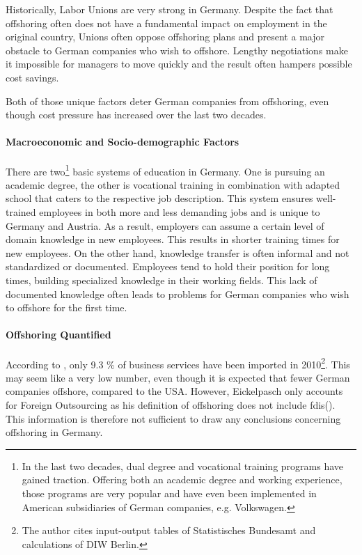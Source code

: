 Historically, Labor Unions are very strong in Germany. Despite the fact that offshoring often does not have a fundamental impact on employment in the original country, Unions often oppose offshoring plans and present a major obstacle to German companies who wish to offshore. Lengthy negotiations make it impossible for managers to move quickly and the result often hampers possible cost savings.

Both of those unique factors deter German companies from offshoring, even though cost pressure has increased over the last two decades.

\paragraph{Macroeconomic and Socio-demographic Factors}
There are two\footnote{In the last two decades, dual degree and vocational training programs have gained traction. Offering both an academic degree and working experience, those programs are very popular and have even been implemented in American subsidiaries of German companies, e.g. Volkswagen.} basic systems of education in Germany. One is pursuing an academic degree, the other is vocational training in combination with adapted school that caters to the respective job description. This system ensures well-trained employees in both more and less demanding jobs and is unique to Germany and Austria. As a result, employers can assume a certain level of domain knowledge in new employees. This results in shorter training times for new employees. On the other hand, knowledge transfer is often informal and not standardized or documented. Employees tend to hold their position for long times, building specialized knowledge in their working fields. This lack of documented knowledge often leads to problems for German companies who wish to offshore for the first time.


\paragraph{Offshoring Quantified}
According to \cite[p. 70]{Eickelpasch.2015}, only 9.3 \% of business services have been imported in 2010\footnote{The author cites input-output tables of  Statistisches Bundesamt and calculations of DIW Berlin.}. This may seem like a very low number, even though it is expected that fewer German companies offshore, compared to the USA. However, Eickelpasch only accounts for Foreign Outsourcing as his definition of offshoring does not include \glspl{fdi}(\cite[p. 56]{Eickelpasch.2015}). This information is therefore not sufficient to draw any conclusions concerning offshoring in Germany.

